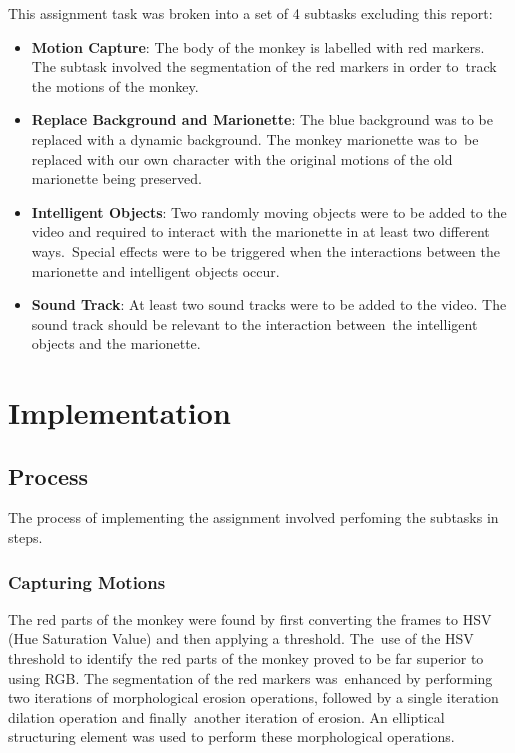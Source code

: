 \documentclass[12pt,a4paper]{article}
\begin{document}
      This assignment task was broken into a set of 4 subtasks excluding this report:
      \begin{itemize}
        \item \textbf{Motion Capture}: The body of the monkey is labelled with red markers. The subtask involved the segmentation of the red markers in order to\
        track the motions of the monkey.
        \item \textbf{Replace Background and Marionette}: The blue background was to be replaced with a dynamic background. The monkey marionette was to\
        be replaced with our own character with the original motions of the old marionette being preserved.
        \item \textbf{Intelligent Objects}: Two randomly moving objects were to be added to the video and required to interact with the marionette in at least two different ways.\
        Special effects were to be triggered when the interactions between the marionette and intelligent objects occur.
        \item \textbf{Sound Track}: At least two sound tracks were to be added to the video. The sound track should be relevant to the interaction between\
        the intelligent objects and the marionette.
      \end{itemize}

    \section{Implementation}
      \subsection{Process}
        The process of implementing the assignment involved perfoming the subtasks in steps.

        \subsubsection{Capturing Motions}
        The red parts of the monkey were found by first converting the frames to HSV (Hue Saturation Value) and then applying a threshold. The\
        use of the HSV threshold to identify the red parts of the monkey proved to be far superior to using RGB. The segmentation of the red markers was\
        enhanced by performing two iterations of morphological erosion operations, followed by a single iteration dilation operation and finally\
        another iteration of erosion. An elliptical structuring element was used to perform these morphological operations.
\end{document}
